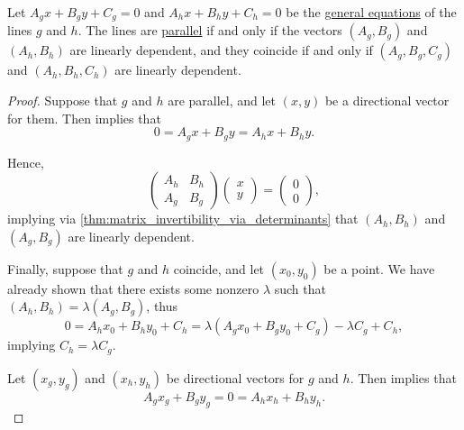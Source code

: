 \begin{proposition}\label{thm:parallel_lines_in_plane}
  Let \( A_g x + B_g y + C_g = 0 \) and \( A_h x + B_h y + C_h = 0 \) be the \hyperref[def:plane_line_equations/general]{general equations} of the lines \( g \) and \( h \). The lines are \hyperref[def:affine_parallelism]{parallel} if and only if the vectors \( (A_g, B_g) \) and \( (A_h, B_h) \) are linearly dependent, and they coincide if and only if \( (A_g, B_g, C_g) \) and \( (A_h, B_h, C_h) \) are linearly dependent.
\end{proposition}
\begin{proof}
  \SufficiencySubProof Suppose that \( g \) and \( h \) are parallel, and let \( (x, y) \) be a directional vector for them. Then  implies that
  \begin{equation*}
    0 = A_g x + B_g y = A_h x + B_h y.
  \end{equation*}

  Hence,
  \begin{equation*}
    \begin{pmatrix}
      A_h & B_h \\
      A_g & B_g
    \end{pmatrix}
    \begin{pmatrix}
      x \\ y
    \end{pmatrix}
    =
    \begin{pmatrix}
      0 \\ 0
    \end{pmatrix},
  \end{equation*}
  implying via \cref{thm:matrix_invertibility_via_determinants} that \( (A_h, B_h) \) and \( (A_g, B_g) \) are linearly dependent.

  Finally, suppose that \( g \) and \( h \) coincide, and let \( (x_0, y_0) \) be a point. We have already shown that there exists some nonzero \( \lambda \) such that \( (A_h, B_h) = \lambda (A_g, B_g) \), thus
  \begin{equation*}
    0 = A_h x_0 + B_h y_0 + C_h = \lambda (A_g x_0 + B_g y_0 + C_g) - \lambda C_g + C_h,
  \end{equation*}
  implying \( C_h = \lambda C_g \).

  \NecessitySubProof Let \( (x_g, y_g) \) and \( (x_h, y_h) \) be directional vectors for \( g \) and \( h \). Then  implies that
  \begin{equation*}
    A_g x_g + B_g y_g = 0 = A_h x_h + B_h y_h.
  \end{equation*}


\end{proof}
